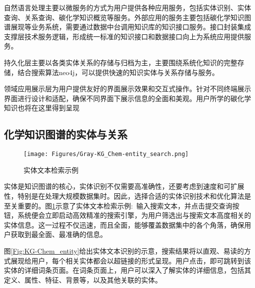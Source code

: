 自然语言处理主要以微服务的方式为用户提供各种应用服务，包括实体识别、实体查询、关系查询、碳化学知识概览等服务。外部应用的服务主要包括碳化学知识图谱展现等业务系统，需要通过数据中台调用知识库的知识接口服务。接口封装集成支撑层技术服务逻辑，形成统一标准的知识接口和数据接口向上为系统应用提供服务。

持久化层主要以各类实体关系的存储与归档为主，主要围绕系统化知识的完整存储，结合搜索算法\textrm{neo4j}，可以提供快速的知识实体与关系存储与服务。

领域应用展示层为用户提供友好的界面展示效果和交互式操作。针对不同终端展示界面进行设计和适配，确保不同界面下展示信息的全面和美观。用户所学的碳化学知识也将在这里得到呈现

\subsection{化学知识图谱的实体与关系}
\begin{figure}[h!]
	\vskip -10pt
\centering
\texttt{[image: Figures/Gray-KG\_Chem-entity\_search.png]}
\caption{\small\textrm{实体文本检索示例}}%
\label{Fig:KG-Chem_entity_search}
\end{figure}
实体是知识图谱的核心，实体识别不仅需要高准确性，还要考虑到速度和可扩展性，特别是在处理大规模数据集时。因此，选择合适的实体识别技术和优化算法是至关重要的。图\ref{Fig:KG-Chem_entity_search}示意了实体文本检索示例:~输入搜索文本，并点击提交查询按钮，系统便会立即启动高效精准的搜索引擎，为用户筛选出与搜索文本高度相关的实体信息。这一过程不仅迅速，而且全面，能够覆盖数据集中的各个角落，确保用户获取到最全面、最准确的信息。

图\ref{Fig:KG-Chem_entity}给出实体文本识别的示意，搜索结果将以直观、易读的方式展现给用户，每个相关实体都会以超链接的形式呈现。用户点击，即可跳转到该实体的详细词条页面。在词条页面上，用户可以深入了解实体的详细信息，包括其定义、属性、特征、背景等，以及其他关联的实体。

